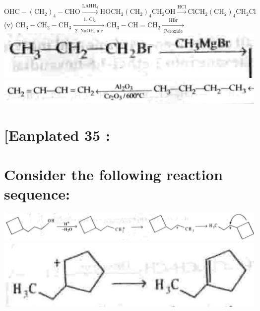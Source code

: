 \documentclass[10pt]{article}
\begin{document}
$\mathrm{OHC}-\left(\mathrm{CH}_{2}\right)_{4}-\mathrm{CHO} \xrightarrow{\mathrm{LAHH}_{4}} \mathrm{HOCH}_{2}\left(\mathrm{CH}_{2}\right)_{4} \mathrm{CH}_{2} \mathrm{OH} \xrightarrow{\mathrm{HCl}} \mathrm{ClCH}_{2}\left(\mathrm{CH}_{2}\right)_{4} \mathrm{CH}_{2} \mathrm{Cl}$\\
(v) $\mathrm{CH}_{3}-\mathrm{CH}_{2}-\mathrm{CH}_{3} \xrightarrow[\text { 2. } \mathrm{NaOH} \text {, alc }]{\text { 1. } \mathrm{Cl}_{2}} \mathrm{CH}_{3}-\mathrm{CH}=\mathrm{CH}_{2} \xrightarrow[\text { Peroxide }]{\mathrm{HBr}}$\\
\includegraphics[max width=\textwidth, center]{2025_01_28_8470952b98110cec3aabg-227(9)}\\
\includegraphics[max width=\textwidth, center]{2025_01_28_8470952b98110cec3aabg-227(2)}

\section*{[Eanplated 35 :}
\section*{Consider the following reaction sequence:}
\includegraphics[max width=\textwidth, center]{2025_01_28_8470952b98110cec3aabg-227(6)}\\
\includegraphics[max width=\textwidth, center]{2025_01_28_8470952b98110cec3aabg-227(5)}
\end{document}
